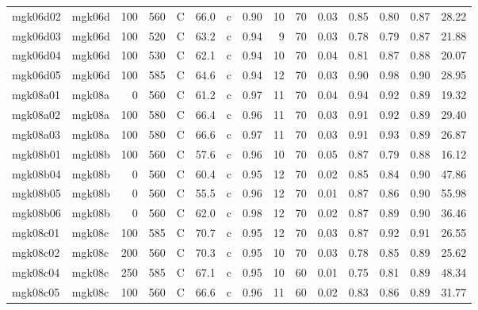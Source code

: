 \documentclass{article}
\begin{document}
\begin{landscape}
\begin{longtable}{llrrlrlrrrrrrrr}
    mgk06d02 &     mgk06d &  100 &  560 &     C &    66.0 &   c &  0.90 &  10 &         70 &  0.03 &  0.85 &  0.80 &  0.87 &   28.22 \\
    mgk06d03 &     mgk06d &  100 &  520 &     C &    63.2 &   c &  0.94 &   9 &         70 &  0.03 &  0.78 &  0.79 &  0.87 &   21.88 \\
    mgk06d04 &     mgk06d &  100 &  530 &     C &    62.1 &   c &  0.94 &  10 &         70 &  0.04 &  0.81 &  0.87 &  0.88 &   20.07 \\
    mgk06d05 &     mgk06d &  100 &  585 &     C &    64.6 &   c &  0.94 &  12 &         70 &  0.03 &  0.90 &  0.98 &  0.90 &   28.95 \\
    mgk08a01 &     mgk08a &    0 &  560 &     C &    61.2 &   c &  0.97 &  11 &         70 &  0.04 &  0.94 &  0.92 &  0.89 &   19.32 \\
    mgk08a02 &     mgk08a &  100 &  580 &     C &    66.4 &   c &  0.96 &  11 &         70 &  0.03 &  0.91 &  0.92 &  0.89 &   29.40 \\
    mgk08a03 &     mgk08a &  100 &  580 &     C &    66.6 &   c &  0.97 &  11 &         70 &  0.03 &  0.91 &  0.93 &  0.89 &   26.87 \\
    mgk08b01 &     mgk08b &  100 &  560 &     C &    57.6 &   c &  0.96 &  10 &         70 &  0.05 &  0.87 &  0.79 &  0.88 &   16.12 \\
    mgk08b04 &     mgk08b &    0 &  560 &     C &    60.4 &   c &  0.95 &  12 &         70 &  0.02 &  0.85 &  0.84 &  0.90 &   47.86 \\
    mgk08b05 &     mgk08b &    0 &  560 &     C &    55.5 &   c &  0.96 &  12 &         70 &  0.01 &  0.87 &  0.86 &  0.90 &   55.98 \\
    mgk08b06 &     mgk08b &    0 &  560 &     C &    62.0 &   c &  0.98 &  12 &         70 &  0.02 &  0.87 &  0.89 &  0.90 &   36.46 \\
    mgk08c01 &     mgk08c &  100 &  585 &     C &    70.7 &   c &  0.95 &  12 &         70 &  0.03 &  0.87 &  0.92 &  0.91 &   26.55 \\
    mgk08c02 &     mgk08c &  200 &  560 &     C &    70.3 &   c &  0.95 &  10 &         70 &  0.03 &  0.78 &  0.85 &  0.89 &   25.62 \\
    mgk08c04 &     mgk08c &  250 &  585 &     C &    67.1 &   c &  0.95 &  10 &         60 &  0.01 &  0.75 &  0.81 &  0.89 &   48.34 \\
    mgk08c05 &     mgk08c &  100 &  560 &     C &    66.6 &   c &  0.96 &  11 &         60 &  0.02 &  0.83 &  0.86 &  0.89 &   31.77 \\

\end{longtable}
\end{landscape}
\end{document}

